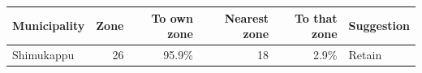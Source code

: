 \begin{tabular}{lrrrrl}
\toprule
Municipality & Zone & To own zone & Nearest zone & To that zone & Suggestion \\
\midrule
Shimukappu & 26 & 95.9\% & 18 & 2.9\% & Retain \\
\bottomrule
\end{tabular}
